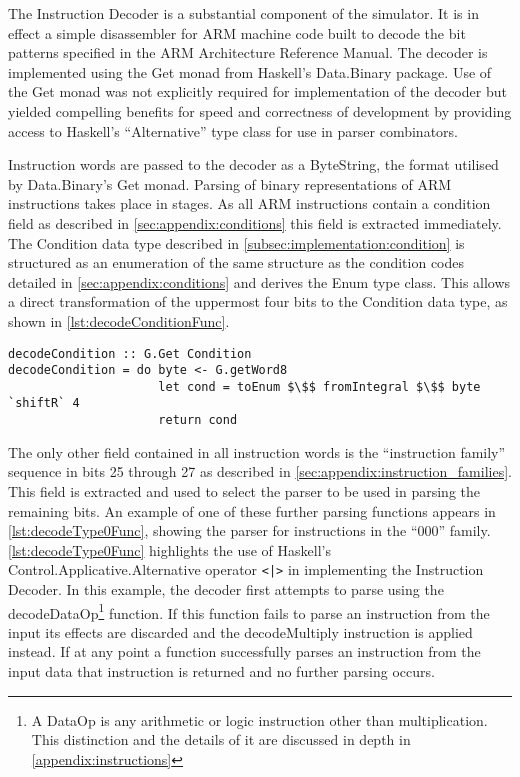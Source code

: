 The Instruction Decoder is a substantial component of the simulator. It is in effect a simple disassembler for ARM machine code built to decode the bit patterns specified in the ARM Architecture Reference Manual\citep[ch. A3]{armarm:2005}. The decoder is implemented using the Get monad from Haskell's Data.Binary package. Use of the Get monad was not explicitly required for implementation of the decoder but yielded compelling benefits for speed and correctness of development by providing access to Haskell's ``Alternative'' type class for use in parser combinators.

Instruction words are passed to the decoder as a ByteString, the format utilised by Data.Binary's Get monad. Parsing of binary representations of ARM instructions takes place in stages. As all ARM instructions contain a condition field as described in \autoref{sec:appendix:conditions} this field is extracted immediately. The Condition data type described in \autoref{subsec:implementation:condition} is structured as an enumeration of the same structure as the condition codes detailed in \autoref{sec:appendix:conditions} and derives the Enum type class. This allows a direct transformation of the uppermost four bits to the Condition data type, as shown in \autoref{lst:decodeConditionFunc}.

\begin{lstlisting}[mathescape,numbers=none,caption={The $decodeCondition$ function},label={lst:decodeConditionFunc}]
decodeCondition :: G.Get Condition
decodeCondition = do byte <- G.getWord8
                     let cond = toEnum $\$$ fromIntegral $\$$ byte `shiftR` 4
                     return cond
\end{lstlisting}

The only other field contained in all instruction words is the ``instruction family'' sequence in bits 25 through 27 as described in \autoref{sec:appendix:instruction_families}. This field is extracted and used to select the parser to be used in parsing the remaining bits. An example of one of these further parsing functions appears in \autoref{lst:decodeType0Func}, showing the parser for instructions in the ``000'' family. \autoref{lst:decodeType0Func} highlights the use of Haskell's Control.Applicative.Alternative operator \lstinline!<|>! in implementing the Instruction Decoder. In this example, the decoder first attempts to parse using the decodeDataOp\footnote{A DataOp is any arithmetic or logic instruction other than multiplication. This distinction and the details of it are discussed in depth in \autoref{appendix:instructions}} function. If this function fails to parse an instruction from the input its effects are discarded and the decodeMultiply instruction is applied instead. If at any point a function successfully parses an instruction from the input data that instruction is returned and no further parsing occurs.

